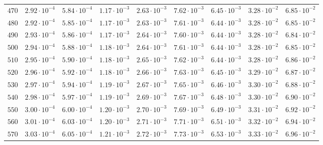 \begin{landscape}
\begin{table}
\begin{tabular}{lcccccccc}
$	470	$ & $	2.92 \cdot 10^{-4}	$ & $	5.84 \cdot 10^{-4}	$ & $	1.17 \cdot 10^{-3}	$ & $	2.63 \cdot 10^{-3}	$ & $	7.62 \cdot 10^{-3}	$ & $	6.45 \cdot 10^{-3}	$ & $	3.28 \cdot 10^{-2}	$ & $	6.85 \cdot 10^{-2}	 $ \\
$	480	$ & $	2.92 \cdot 10^{-4}	$ & $	5.85 \cdot 10^{-4}	$ & $	1.17 \cdot 10^{-3}	$ & $	2.63 \cdot 10^{-3}	$ & $	7.61 \cdot 10^{-3}	$ & $	6.44 \cdot 10^{-3}	$ & $	3.28 \cdot 10^{-2}	$ & $	6.85 \cdot 10^{-2}	 $ \\
$	490	$ & $	2.93 \cdot 10^{-4}	$ & $	5.86 \cdot 10^{-4}	$ & $	1.17 \cdot 10^{-3}	$ & $	2.64 \cdot 10^{-3}	$ & $	7.60 \cdot 10^{-3}	$ & $	6.44 \cdot 10^{-3}	$ & $	3.28 \cdot 10^{-2}	$ & $	6.84 \cdot 10^{-2}	 $ \\
$	500	$ & $	2.94 \cdot 10^{-4}	$ & $	5.88 \cdot 10^{-4}	$ & $	1.18 \cdot 10^{-3}	$ & $	2.64 \cdot 10^{-3}	$ & $	7.61 \cdot 10^{-3}	$ & $	6.44 \cdot 10^{-3}	$ & $	3.28 \cdot 10^{-2}	$ & $	6.85 \cdot 10^{-2}	 $ \\
$	510	$ & $	2.95 \cdot 10^{-4}	$ & $	5.90 \cdot 10^{-4}	$ & $	1.18 \cdot 10^{-3}	$ & $	2.65 \cdot 10^{-3}	$ & $	7.62 \cdot 10^{-3}	$ & $	6.44 \cdot 10^{-3}	$ & $	3.28 \cdot 10^{-2}	$ & $	6.86 \cdot 10^{-2}	 $ \\
$	520	$ & $	2.96 \cdot 10^{-4}	$ & $	5.92 \cdot 10^{-4}	$ & $	1.18 \cdot 10^{-3}	$ & $	2.66 \cdot 10^{-3}	$ & $	7.63 \cdot 10^{-3}	$ & $	6.45 \cdot 10^{-3}	$ & $	3.29 \cdot 10^{-2}	$ & $	6.87 \cdot 10^{-2}	 $ \\
$	530	$ & $	2.97 \cdot 10^{-4}	$ & $	5.94 \cdot 10^{-4}	$ & $	1.19 \cdot 10^{-3}	$ & $	2.67 \cdot 10^{-3}	$ & $	7.65 \cdot 10^{-3}	$ & $	6.46 \cdot 10^{-3}	$ & $	3.30 \cdot 10^{-2}	$ & $	6.88 \cdot 10^{-2}	 $ \\
$	540	$ & $	2.98 \cdot 10^{-4}	$ & $	5.97 \cdot 10^{-4}	$ & $	1.19 \cdot 10^{-3}	$ & $	2.69 \cdot 10^{-3}	$ & $	7.67 \cdot 10^{-3}	$ & $	6.48 \cdot 10^{-3}	$ & $	3.30 \cdot 10^{-2}	$ & $	6.90 \cdot 10^{-2}	 $ \\
$	550	$ & $	3.00 \cdot 10^{-4}	$ & $	6.00 \cdot 10^{-4}	$ & $	1.20 \cdot 10^{-3}	$ & $	2.70 \cdot 10^{-3}	$ & $	7.69 \cdot 10^{-3}	$ & $	6.49 \cdot 10^{-3}	$ & $	3.31 \cdot 10^{-2}	$ & $	6.92 \cdot 10^{-2}	 $ \\
$	560	$ & $	3.01 \cdot 10^{-4}	$ & $	6.03 \cdot 10^{-4}	$ & $	1.20 \cdot 10^{-3}	$ & $	2.71 \cdot 10^{-3}	$ & $	7.71 \cdot 10^{-3}	$ & $	6.51 \cdot 10^{-3}	$ & $	3.32 \cdot 10^{-2}	$ & $	6.94 \cdot 10^{-2}	 $ \\
$	570	$ & $	3.03 \cdot 10^{-4}	$ & $	6.05 \cdot 10^{-4}	$ & $	1.21 \cdot 10^{-3}	$ & $	2.72 \cdot 10^{-3}	$ & $	7.73 \cdot 10^{-3}	$ & $	6.53 \cdot 10^{-3}	$ & $	3.33 \cdot 10^{-2}	$ & $	6.96 \cdot 10^{-2}	 $ \\

\end{tabular}
\end{table}
\end{landscape}
